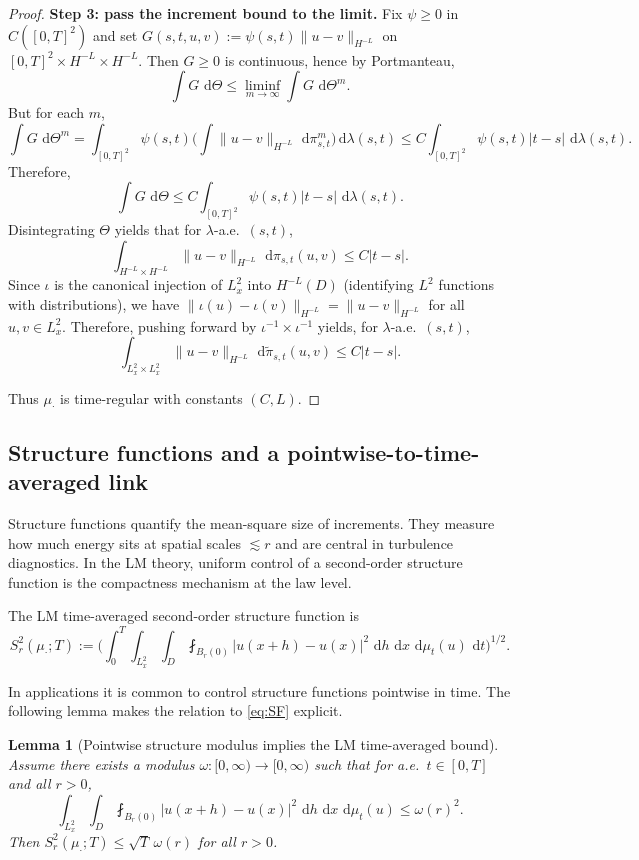 \documentclass{article}
\numberwithin{equation}{section}
\theoremstyle{plain}
\newtheorem{lemma}[theorem]{Lemma}
\theoremstyle{definition}
\theoremstyle{remark}
\newcommand{\dd}{\,\mathrm{d}}
\begin{document}
\begin{proof}
\smallskip
\noindent\textbf{Step 3: pass the increment bound to the limit.}
Fix $\psi\ge0$ in $C([0,T]^2)$ and set $G(s,t,u,v):=\psi(s,t)\|u-v\|_{H^{-L}}$ on $[0,T]^2\times H^{-L}\times H^{-L}$.
Then $G\ge0$ is continuous, hence by Portmanteau,
\[
\int G\,\dd\Theta
\le \liminf_{m\to\infty}\int G\,\dd\Theta^m.
\]
But for each $m$,
\[
\int G\,\dd\Theta^m
=
\int_{[0,T]^2}\psi(s,t)\Big(\int\|u-v\|_{H^{-L}}\,\dd\pi^m_{s,t}\Big)\dd\lambda(s,t)
\le C\int_{[0,T]^2}\psi(s,t)|t-s|\,\dd\lambda(s,t).
\]
Therefore,
\[
\int G\,\dd\Theta
\le C\int_{[0,T]^2}\psi(s,t)|t-s|\,\dd\lambda(s,t).
\]
Disintegrating $\Theta$ yields that for $\lambda$-a.e.\ $(s,t)$,
\[
\int_{H^{-L}\times H^{-L}}\|u-v\|_{H^{-L}}\,\dd\pi_{s,t}(u,v)\le C|t-s|.
\]
Since $\iota$ is the canonical injection of $L^2_x$ into $H^{-L}(D)$ (identifying $L^2$ functions with distributions),
we have $\|\iota(u)-\iota(v)\|_{H^{-L}}=\|u-v\|_{H^{-L}}$ for all $u,v\in L^2_x$. Therefore, pushing forward by $\iota^{-1}\times\iota^{-1}$ yields, for $\lambda$-a.e.\ $(s,t)$,
\[
\int_{L^2_x\times L^2_x}\|u-v\|_{H^{-L}}\,\dd\widetilde\pi_{s,t}(u,v)\le C|t-s|.
\]

Thus $\mu_\cdot$ is time-regular with constants $(C,L)$.
\end{proof}



\subsection{Structure functions and a pointwise-to-time-averaged link}

Structure functions quantify the mean-square size of increments. They measure how much energy sits at spatial scales
$\lesssim r$ and are central in turbulence diagnostics. In the LM theory, uniform control of a second-order structure
function is the compactness mechanism at the law level.

The LM time-averaged second-order structure function is
\begin{equation}\label{eq:SF}
S_r^2(\mu_\cdot;T)
:=
\Bigg(\int_0^T\int_{L^2_x}\int_D\fint_{B_r(0)}|u(x+h)-u(x)|^2\,\dd h\,\dd x\,\dd\mu_t(u)\,\dd t\Bigg)^{1/2}.
\end{equation}

In applications it is common to control structure functions pointwise in time. The following lemma makes the relation to
\eqref{eq:SF} explicit.

\begin{lemma}[Pointwise structure modulus implies the LM time-averaged bound]
\label{lem:pointwise-to-timeavg}
Assume there exists a modulus $\omega:[0,\infty)\to[0,\infty)$ such that for a.e.\ $t\in[0,T]$ and all $r>0$,
\begin{equation}\label{eq:pointwise-struct}
\int_{L^2_x}\int_D\fint_{B_r(0)}|u(x+h)-u(x)|^2\,\dd h\,\dd x\,\dd\mu_t(u)\le \omega(r)^2.
\end{equation}
Then $S_r^2(\mu_\cdot;T)\le \sqrt{T}\,\omega(r)$ for all $r>0$.
\end{lemma}
\end{document}
